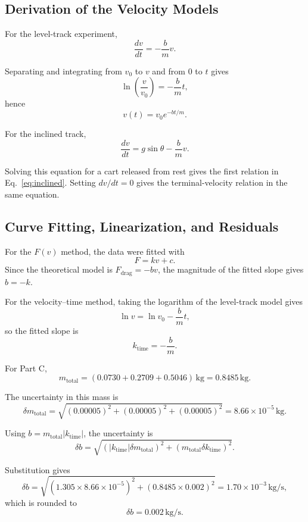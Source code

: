 \documentclass[11pt,a4paper]{article}
\begin{document}

\subsection{Derivation of the Velocity Models}
\label{app:derivation}

For the level-track experiment,
\[
\frac{dv}{dt}=-\frac{b}{m}v.
\]

Separating and integrating from \(v_0\) to \(v\) and from \(0\) to \(t\) gives
\[
\ln\left(\frac{v}{v_0}\right)
=-\frac{b}{m}t,
\]
hence
\[
v(t)=v_0e^{-bt/m}.
\]

For the inclined track,
\[
\frac{dv}{dt}
=g\sin\theta-\frac{b}{m}v.
\]

Solving this equation for a cart released from rest gives the first relation in Eq.~\ref{eq:inclined}. Setting \(dv/dt=0\) gives the terminal-velocity relation in the same equation.


\subsection{Curve Fitting, Linearization, and Residuals}
\label{app:fitting}

For the \(F(v)\) method, the data were fitted with
\[
F=kv+c.
\]
Since the theoretical model is \(F_{\mathrm{drag}}=-bv\),
the magnitude of the fitted slope gives \(b=-k\).

For the velocity--time method, taking the logarithm of the level-track model gives
\[
\ln v=\ln v_0-\frac{b}{m}t,
\]
so the fitted slope is
\[
k_{\mathrm{time}}=-\frac{b}{m}.
\]

For Part C,
\[
m_{\mathrm{total}}
=(0.0730+0.2709+0.5046)\,\mathrm{kg}
=0.8485\,\mathrm{kg}.
\]

The uncertainty in this mass is
\[
\delta m_{\mathrm{total}}
=
\sqrt{(0.00005)^2+(0.00005)^2+(0.00005)^2}
=
8.66\times10^{-5}\,\mathrm{kg}.
\]

Using
\(b=m_{\mathrm{total}}|k_{\mathrm{time}}|\),
the uncertainty is
\[
\delta b
=
\sqrt{
\left(
|k_{\mathrm{time}}|\delta m_{\mathrm{total}}
\right)^2
+
\left(
m_{\mathrm{total}}\delta k_{\mathrm{time}}
\right)^2
}.
\]

Substitution gives
\[
\delta b
=
\sqrt{
(1.305\times8.66\times10^{-5})^2
+
(0.8485\times0.002)^2
}
=
1.70\times10^{-3}\,\mathrm{kg/s},
\]
which is rounded to
\[
\delta b=0.002\,\mathrm{kg/s}.
\]
\end{document}
